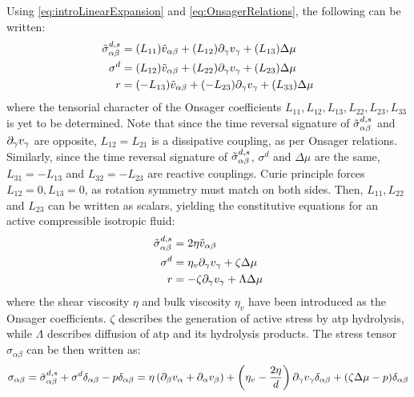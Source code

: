 Using \autoref{eq:introLinearExpansion} and \autoref{eq:OnsagerRelations}, the following can be written:
\begin{subequations}\label{eq:introActiveSimpleFluidOnsager}
    \begin{align}
        \Tilde{\sigma}^{d,s}_{\alpha\beta} &= (L_{11})\Tilde{v}_{\alpha\beta} + (L_{12})\inlinePartial{\gamma}v_\gamma + (L_{13})\Delta \mu\\
        \sigma^d &= (L_{12})\Tilde{v}_{\alpha\beta} + (L_{22})\inlinePartial{\gamma}v_\gamma + (L_{23})\Delta \mu\\
        r &= (-L_{13})\Tilde{v}_{\alpha\beta} + (-L_{23})\inlinePartial{\gamma}v_\gamma + (L_{33})\Delta \mu
    \end{align}
\end{subequations}
where the tensorial character of the Onsager coefficients $L_{11}, L_{12}, L_{13}, L_{22}, L_{23}, L_{33}$ is yet to be determined. Note that since the time reversal signature of $\Tilde{\sigma}^{d,s}_{\alpha\beta}$ and $\inlinePartial{\gamma}v_\gamma$ are opposite, $L_{12} = L_{21}$ is a dissipative coupling, as per Onsager relations. Similarly, since the time reversal signature of $\Tilde{\sigma}^{d,s}_{\alpha\beta}$, $\sigma^d$ and $\Delta\mu$ are the same, $L_{31} = -L_{13}$ and $L_{32} = -L_{23}$ are reactive couplings. Curie principle forces $L_{12} = 0, L_{13} = 0$, as rotation symmetry must match on both sides. Then, $L_{11}, L_{22}$ and $L_{23}$ can be written as scalars, yielding the constitutive equations for an active compressible isotropic fluid:
\begin{subequations}\label{eq:introActiveSimpleFluidConsitutive}
    \begin{align}
        \Tilde{\sigma}^{d,s}_{\alpha\beta} &= 2\eta \Tilde{v}_{\alpha\beta}\\
        \sigma^d &= \eta_v\inlinePartial{\gamma}v_\gamma + \zeta \Delta \mu\\
        r &= -\zeta\inlinePartial{\gamma}v_\gamma + \Lambda \Delta \mu
    \end{align}
\end{subequations}
where the shear viscosity $\eta$ and bulk viscosity $\eta_v$ have been introduced as the Onsager coefficients. $\zeta$ describes the generation of active stress by \ac{atp} hydrolysis, while $\Lambda$ describes diffusion of \ac{atp} and its hydrolysis products. The stress tensor $\sigma_{\alpha\beta}$ can be then written as:
\begin{equation}\label{eq:introActiveSimpleFluidStress}
    \sigma_{\alpha\beta} = \Tilde{\sigma}^{d,s}_{\alpha\beta} + \sigma^d\delta_{\alpha\beta} -p\delta_{\alpha\beta} = \eta \left(\inlinePartial{\beta}{v_\alpha} + \inlinePartial{\alpha}{v_\beta}\right) + \left(\eta_v - \frac{2\eta}{d}\right)\inlinePartial{\gamma}v_{\gamma}\delta_{\alpha\beta} +  (\zeta\Delta\mu - p)\delta_{\alpha\beta}
\end{equation}
